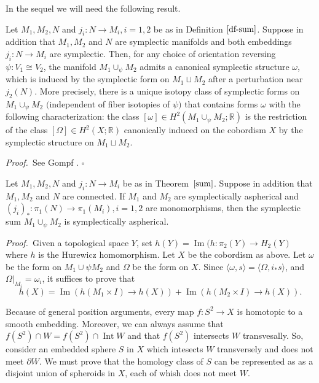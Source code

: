 \documentclass[12pt, twoside]{amsart}
\theoremstyle{plain}
\theoremstyle{definition}
\numberwithin{equation}{section}
\def\RR{\mathbb R}
\def\Im{\operatorname {Im}}
\def\hqed{\hfill\hfill$\square$}
\def\Int{\operatorname {Int}}
\def\pa{\partial}
\def\RR{\mathbb R}
\def\m{\medskip}
\def\p{{\it Proof.\ }}
\begin{document}
In the sequel we will need the following result.

\begin{theorem}\label{sum}
Let $M_1, M_2, N$ and $j_i: N \to M_i, i=1,2$ be as in Definition 
$\ref{df-sum}$. Suppose in addition that $M_1, M_2$ and $N$ are symplectic 
manifolds and both embeddings $j_i: N \to M_i$ are symplectic. Then, for any 
choice of orientation reversing $\psi: V_1\cong V_2$, the manifold 
$M_1\cup_{\psi}M_2$ admits a canonical symplectic structure $\omega$, which is 
induced by the symplectic form on $M_1\sqcup M_2$ after a perturbation near
$j_2(N)$. More precisely, there is a unique isotopy class of symplectic forms
on $M_1\cup_{\psi}M_2$ $($independent of fiber isotopies of $\psi)$ that 
contains 
forms $\omega$ with the following characterization: the class $[\omega]\in
H^2(M_1\cup_{\psi}M_2;\RR)$ is the restriction of the class $[\Omega]\in 
H^2(X;\RR)$ canonically induced on the cobordism $X$ by the symplectic 
structure 
on 
$M_1\sqcup M_2$.
\end{theorem}

\p See Gompf \cite{G1}.
\hqed

\begin{theorem}\label{sum-sas}
Let $M_1,M_2,N$ and $j_i:N\to M_i$ be as in Theorem~$\ref{sum}$. Suppose in 
addition 
that $M_1, M_2$ and $N$ are connected.
If $M_1$ and $M_2$ are symplectically aspherical
and $(j_i)_*:\pi_1(N)\to \pi_1(M_i), i=1,2$ are monomorphisms,
then the symplectic sum 
$M_1\cup_{\psi }M_2$ is symplectically
aspherical.
\end{theorem}


\p Given a topological space $Y$, set $h(Y)=\Im(h:\pi_2(Y) \to H_2(Y)$ where 
$h$ is the Hurewicz homomorphism.
Let $X$ be the cobordism as above. Let $\omega$ be the form on $M_1\cup 
{\psi}M_2$ 
and $\Omega$ be the form on $X$. Since $\langle \omega, s\rangle= \langle 
\Omega, i_*s\rangle$, and $\Omega|_{M_i}=\omega_i$, it suffices to prove 
that 
$$
h(X)=\Im(h(M_1\times I)\to h(X))+\Im(h(M_2\times I)\to h(X)).
$$

\m
Because of general position arguments, every map $f:S^2\to X$ is homotopic 
to a smooth embedding. Moreover, we can always assume that $f(S^2)\cap W = 
f(S^2)\cap \Int W$ and that $f(S^2)$ intersects $W$ transvesally. So, 
consider an embedded sphere $S$ in $X$ which intesects $W$ transversely and 
does not meet $\pa W$. We must prove that the homology class of $S$ can be 
represented as as a disjoint union of spheroids in $X$, each of whish does not 
meet $W$.
\end{document}
